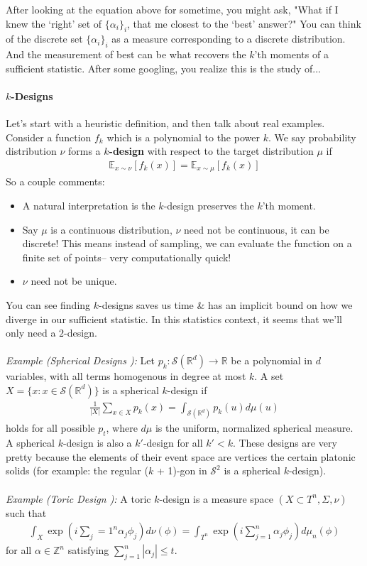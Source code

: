 \documentclass{article}
\begin{document}
After looking at the equation above for sometime, you might ask, "What if I knew the `right' set of $\{\alpha_i\}_i$, that me closest to the `best' answer?" You can think of the discrete set $\{\alpha_i\}_i$ as a measure corresponding to a discrete distribution. And the measurement of best can be what recovers the $k$'th moments of a sufficient statistic. After some googling, you realize this is the study of...

\paragraph{$k$-Designs}
Let's start with a heuristic definition, and then talk about real examples. Consider a function $f_k$ which is a polynomial to the power $k$. We say probability distribution $\nu$ forms a \textbf{$k$-design} with respect to the target distribution $\mu$ if
\begin{align}
	\mathbb E_{x \sim \nu}[f_k(x)] = \mathbb E_{x \sim \mu}[f_k(x)]
\end{align}
So a couple comments:
\begin{itemize}
	\item A natural interpretation is the $k$-design preserves the $k$'th moment.
	\item Say $\mu$ is a continuous distribution, $\nu$ need not be continuous, it can be discrete! This means instead of sampling, we can evaluate the function on a finite set of points-- very computationally quick! 
	\item $\nu$ need not be unique.
\end{itemize}
You can see finding $k$-designs saves us time \& has an implicit bound on how we diverge in our sufficient statistic. In this statistics context, it seems that we'll only need a $2$-design.
\\
\\
\emph{Example (Spherical Designs \cite{colbourn2006handbook, delsarte1977spherical}):} Let $p_k : \mathcal S(\mathbb R^d) \to \mathbb R$ be a polynomial in $d$ variables, with all terms homogenous in degree at most $k$. A set $X = \{x : x \in \mathcal S(\mathbb R^d)\}$ is a spherical $k$-design if 
\begin{align}
	\frac{1}{|X|} \sum_{x \in X}p_k(x) = \int_{\mathcal S(\mathbb R^d)} p_k(u) d\mu(u)
\end{align} holds for all possible $p_t$, where $d\mu$ is the uniform, normalized spherical measure. A spherical $k$-design is also a $k'$-design for all $k' < k$. These designs are very pretty because the elements of their event space are vertices the certain platonic solids (for example: the regular ($k$ + 1)-gon in $\mathcal S^2$ is a spherical $k$-design).
\\
\\
\emph{Example (Toric Design \cite{Iosue2024projectivetoric}):} A toric $k$-design is a measure space $(X \subset T^n, \Sigma, \nu)$ such that
\begin{align}
	\int_X \exp\left( i \sum_j=1^n \alpha_j \phi_j \right) d\nu(\phi) = \int_{T^n} \exp \left( i \sum_{j=1}^n \alpha_j \phi_j\right) d\mu_n (\phi)
\end{align}
for all $\alpha \in \mathbb Z^n$ satisfying $\sum_{j=1}^n |\alpha_j| \leq t$.
\end{document}
